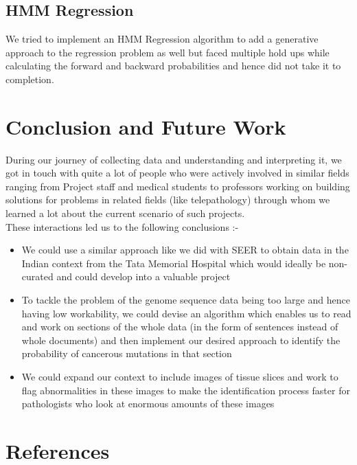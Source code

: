 \documentclass[15pt]{article}
\begin{document}
\subsection{HMM Regression}
We tried to implement an HMM Regression algorithm to add a generative approach to the regression \hspace*{5mm} problem as well but faced multiple hold ups while calculating the forward and backward probabilities \hspace*{5mm} and hence did not take it to completion.

\section{Conclusion and Future Work}
During our journey of collecting data and understanding and interpreting it, we got in touch with quite \hspace*{5mm} a lot of people who were actively involved in similar fields ranging from Project staff and medical students \hspace*{4.5mm} to professors working on building solutions for problems in related fields (like telepathology) through \hspace*{4.55mm}  whom we learned a lot about the current scenario of such projects. \\\hspace*{4.5mm} These interactions led us to the following conclusions :- \\
\begin{itemize}
\item We could use a similar approach like we did with SEER to obtain data in the Indian context from the Tata Memorial Hospital which would ideally be non-curated and could develop into a valuable project
\item To tackle the problem of the genome sequence data being too large and hence having low workability, we could devise an algorithm which enables us to read and work on sections of the whole data (in the form of sentences instead of whole documents) and then implement our desired approach to identify the probability of cancerous mutations in that section
\item We could expand our context to include images of tissue slices and work to flag abnormalities in these images to make the identification process faster for pathologists who look at enormous amounts of these images
\end{itemize}

\section{References}
\end{document}
